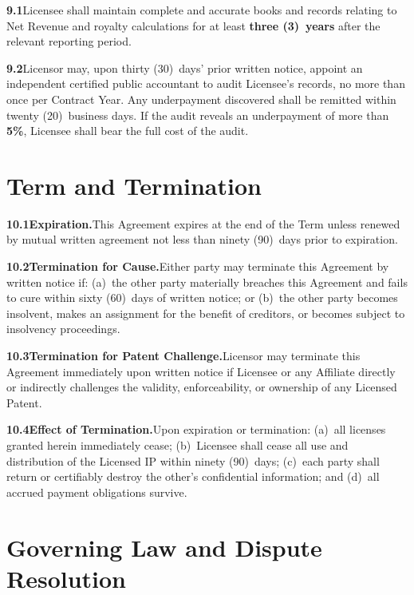\documentclass[11pt,a4paper]{article}
\begin{document}
\textbf{9.1}\enspace Licensee shall maintain complete and accurate books and records relating
to Net Revenue and royalty calculations for at least \textbf{three (3)~years} after the
relevant reporting period.

\textbf{9.2}\enspace Licensor may, upon thirty (30)~days' prior written notice, appoint an
independent certified public accountant to audit Licensee's records, no more than once per
Contract Year. Any underpayment discovered shall be remitted within twenty (20)~business days.
If the audit reveals an underpayment of more than \textbf{5\%}, Licensee shall bear the
full cost of the audit.

\section{Term and Termination}

\textbf{10.1\enspace Expiration.}\enspace This Agreement expires at the end of the Term unless
renewed by mutual written agreement not less than ninety (90)~days prior to expiration.

\textbf{10.2\enspace Termination for Cause.}\enspace Either party may terminate this Agreement
by written notice if: (a)~the other party materially breaches this Agreement and fails to
cure within sixty (60)~days of written notice; or (b)~the other party becomes insolvent,
makes an assignment for the benefit of creditors, or becomes subject to insolvency proceedings.

\textbf{10.3\enspace Termination for Patent Challenge.}\enspace Licensor may terminate this
Agreement immediately upon written notice if Licensee or any Affiliate directly or indirectly
challenges the validity, enforceability, or ownership of any Licensed Patent.

\textbf{10.4\enspace Effect of Termination.}\enspace Upon expiration or termination:
(a)~all licenses granted herein immediately cease; (b)~Licensee shall cease all use and
distribution of the Licensed IP within ninety (90)~days; (c)~each party shall return or
certifiably destroy the other's confidential information; and (d)~all accrued payment
obligations survive.

\section{Governing Law and Dispute Resolution}
\end{document}
